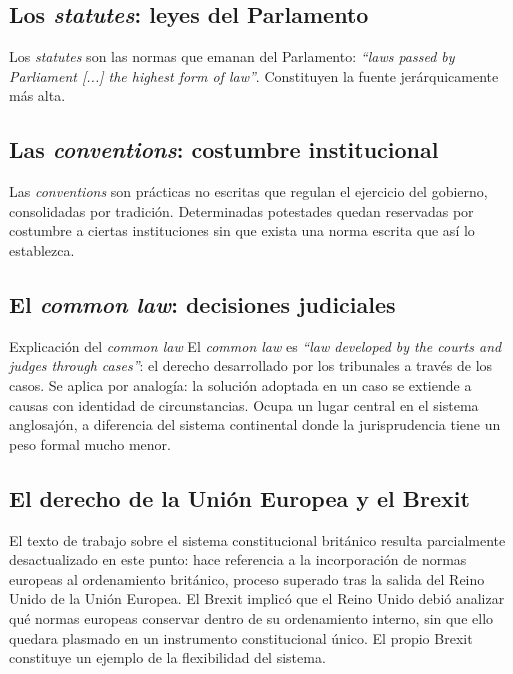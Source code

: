 \documentclass[12pt,oneside]{book}
\begin{document}
\subsection{Los \textit{statutes}: leyes del Parlamento}

Los \textit{statutes} son las normas que emanan del Parlamento: \textit{``laws passed by Parliament [...] the highest form of law''}. Constituyen la fuente jerárquicamente más alta.

\subsection{Las \textit{conventions}: costumbre institucional}

Las \textit{conventions} son prácticas no escritas que regulan el ejercicio del gobierno, consolidadas por tradición. Determinadas potestades quedan reservadas por costumbre a ciertas instituciones sin que exista una norma escrita que así lo establezca.

\subsection{El \textit{common law}: decisiones judiciales}

\begin{example}{Explicación del \textit{common law}}
El \textit{common law} es \textit{``law developed by the courts and judges through cases''}: el derecho desarrollado por los tribunales a través de los casos. Se aplica por analogía: la solución adoptada en un caso se extiende a causas con identidad de circunstancias. Ocupa un lugar central en el sistema anglosajón, a diferencia del sistema continental donde la jurisprudencia tiene un peso formal mucho menor.
\end{example}

\subsection{El derecho de la Unión Europea y el Brexit}

El texto de trabajo sobre el sistema constitucional británico resulta parcialmente desactualizado en este punto: hace referencia a la incorporación de normas europeas al ordenamiento británico, proceso superado tras la salida del Reino Unido de la Unión Europea. El Brexit implicó que el Reino Unido debió analizar qué normas europeas conservar dentro de su ordenamiento interno, sin que ello quedara plasmado en un instrumento constitucional único. El propio Brexit constituye un ejemplo de la flexibilidad del sistema.
\end{document}
